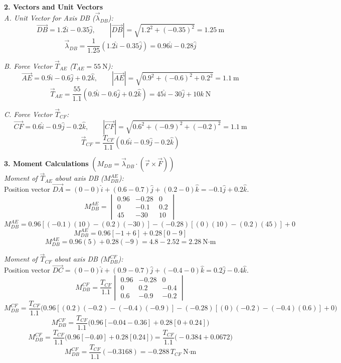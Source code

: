 \documentclass[12pt,a3paper]{article}
\begin{document}
\begin{enumerate}
\begin{tcolorbox}[enhanced,breakable,ansbox,colback=cD!4,colframe=cD,
  boxrule=0.8pt,arc=5pt,
  title={\textbf{Solution}},fonttitle=\bfseries\color{white},
  colbacktitle=cD]
\medskip
\textbf{2. Vectors and Unit Vectors}\\[4pt]

\textit{A. Unit Vector for Axis DB ($\vec{\lambda}_{DB}$):}
\[
  \vec{DB} = 1.2\hat{i} - 0.35\hat{j}, \qquad
  |\vec{DB}| = \sqrt{1.2^2 + (-0.35)^2} = 1.25\ \text{m}
\]
\[
  \vec{\lambda}_{DB} = \frac{1}{1.25}\left(1.2\hat{i} - 0.35\hat{j}\right) = 0.96\hat{i} - 0.28\hat{j}
\]

\textit{B. Force Vector $\vec{T}_{AE}$ ($T_{AE} = 55\ \text{N}$):}
\[
  \vec{AE} = 0.9\hat{i} - 0.6\hat{j} + 0.2\hat{k}, \qquad
  |\vec{AE}| = \sqrt{0.9^2 + (-0.6)^2 + 0.2^2} = 1.1\ \text{m}
\]
\[
  \vec{T}_{AE} = \frac{55}{1.1}\left(0.9\hat{i} - 0.6\hat{j} + 0.2\hat{k}\right)
              = 45\hat{i} - 30\hat{j} + 10\hat{k}\ \text{N}
\]

\textit{C. Force Vector $\vec{T}_{CF}$:}
\[
  \vec{CF} = 0.6\hat{i} - 0.9\hat{j} - 0.2\hat{k}, \qquad
  |\vec{CF}| = \sqrt{0.6^2 + (-0.9)^2 + (-0.2)^2} = 1.1\ \text{m}
\]
\[
  \vec{T}_{CF} = \frac{T_{CF}}{1.1}\left(0.6\hat{i} - 0.9\hat{j} - 0.2\hat{k}\right)
\]

\medskip
\textbf{3. Moment Calculations} $\left(M_{DB} = \vec{\lambda}_{DB} \cdot (\vec{r} \times \vec{F})\right)$\\[4pt]

\textit{Moment of $\vec{T}_{AE}$ about axis DB ($M_{DB}^{AE}$):}\\
Position vector $\vec{DA} = (0-0)\hat{i} + (0.6-0.7)\hat{j} + (0.2-0)\hat{k} = -0.1\hat{j} + 0.2\hat{k}$.
\[
  M_{DB}^{AE} = \begin{vmatrix} 0.96 & -0.28 & 0 \\ 0 & -0.1 & 0.2 \\ 45 & -30 & 10 \end{vmatrix}
\]
\[
  M_{DB}^{AE} = 0.96 [(-0.1)(10) - (0.2)(-30)] - (-0.28) [(0)(10) - (0.2)(45)] + 0
\]
\[
  M_{DB}^{AE} = 0.96 [-1 + 6] + 0.28 [0 - 9]
\]
\[
  M_{DB}^{AE} = 0.96(5) + 0.28(-9) = 4.8 - 2.52 = 2.28\ \text{N·m}
\]

\medskip
\textit{Moment of $\vec{T}_{CF}$ about axis DB ($M_{DB}^{CF}$):}\\
Position vector $\vec{DC} = (0-0)\hat{i} + (0.9-0.7)\hat{j} + (-0.4-0)\hat{k} = 0.2\hat{j} - 0.4\hat{k}$.
\[
  M_{DB}^{CF} = \frac{T_{CF}}{1.1} \begin{vmatrix} 0.96 & -0.28 & 0 \\ 0 & 0.2 & -0.4 \\ 0.6 & -0.9 & -0.2 \end{vmatrix}
\]
\[
  M_{DB}^{CF} = \frac{T_{CF}}{1.1} \Big( 0.96 [(0.2)(-0.2) - (-0.4)(-0.9)] - (-0.28) [(0)(-0.2) - (-0.4)(0.6)] + 0 \Big)
\]
\[
  M_{DB}^{CF} = \frac{T_{CF}}{1.1} \Big( 0.96 [-0.04 - 0.36] + 0.28 [0 + 0.24] \Big)
\]
\[
  M_{DB}^{CF} = \frac{T_{CF}}{1.1} \Big( 0.96 [-0.40] + 0.28 [0.24] \Big) = \frac{T_{CF}}{1.1} \Big( -0.384 + 0.0672 \Big)
\]
\[
  M_{DB}^{CF} = \frac{T_{CF}}{1.1} (-0.3168) = -0.288\, T_{CF}\ \text{N·m}
\]


\end{tcolorbox}
\end{enumerate}
\end{document}
